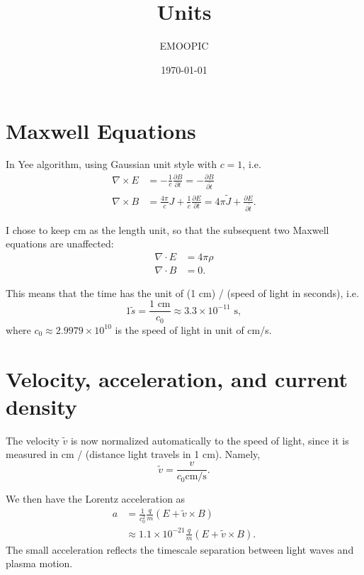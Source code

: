 \documentclass[paper=a4, fontsize=11pt]{scrartcl} %
\title{	
\horrule{0.5pt} \\[0.2cm] %
\huge Units \\[-0.2cm] %
\horrule{2pt} %
}
\author{EMOOPIC} %
\date{\normalsize\today} %
\numberwithin{equation}{section} %
\numberwithin{figure}{section} %
\numberwithin{table}{section} %
\begin{document}
\maketitle %


\section*{Maxwell Equations}

In Yee algorithm, using Gaussian unit style with $c = 1$, i.e.
\begin{align}
	\nabla \times E &= -\frac{1}{c} \frac{\partial B}{\partial t} = -\frac{\partial B}{\partial \tilde{t}}\\
	\nabla \times B &= \frac{4 \pi}{c} J + \frac{1}{c} \frac{\partial E}{\partial t} = 4 \pi \tilde{J} + \frac{\partial E}{\partial \tilde{t}}.
\end{align}

I chose to keep cm as the length unit, so that the subsequent two Maxwell equations are unaffected:
\begin{align}
	\nabla \cdot E &= 4 \pi \rho \\
	\nabla \cdot B &= 0.
\end{align}

This means that the time has the unit of (1 cm) / (speed of light in seconds), i.e.
\begin{equation}
	1 \tilde{s} = \frac{1 \text{ cm}}{c_0} \approx 3.3 \times 10^{-11} \text{ s},
\end{equation}
where $c_0 \approx 2.9979\times 10^{10}$ is the speed of light in unit of cm/s.

\section*{Velocity, acceleration, and current density}

The velocity $\tilde{v}$ is now normalized automatically to the speed of light, since it is measured in cm / (distance light travels in 1 cm). Namely,
\begin{equation}
	\tilde{v}=\frac{v}{c_0 \text{cm/s}}.
\end{equation}

We then have the Lorentz acceleration as
\begin{align}
	a &= \frac{1}{c_0^2} \frac{q}{m} \left( E + \tilde{v} \times B \right)\\
	&\approx 1.1\times 10^{-21} \frac{q}{m} \left( E + \tilde{v} \times B \right).
\end{align}
The small acceleration reflects the timescale separation between light waves and plasma motion.
\end{document}
